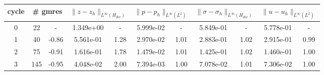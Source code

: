 \documentclass[10pt]{report}
\begin{document}
\begin{table}[H]
\begin{center}
\begin{tabular}{|c|c|c|c|c|c|c|c|c|c|c|} \hline
cycle & 
\multicolumn{2}{|c|}{\# gmres} & 
\multicolumn{2}{|c|}{$ \|z - z_h\|_{L^{\infty}(H_{div})} $} & 
\multicolumn{2}{|c|}{$ \|p - p_h\|_{L^{\infty}(L^2)} $} & 
\multicolumn{2}{|c|}{$ \|\sigma - \sigma_h\|_{L^{\infty}(H_{div})} $} & 
\multicolumn{2}{|c|}{$ \|u - u_h\|_{L^{\infty}(L^2)} $}\\ \hline
0 & 22 & - & 1.349e+00 & - & 5.999e-02 & - & 5.849e-01 & - & 5.778e-01 & -\\ \hline
1 & 40 & -0.86 & 5.561e-01 & 1.28 & 2.970e-02 & 1.01 & 2.883e-01 & 1.02 & 2.915e-01 & 0.99\\ \hline
2 & 75 & -0.91 & 1.616e-01 & 1.78 & 1.479e-02 & 1.01 & 1.425e-01 & 1.02 & 1.460e-01 & 1.00\\ \hline
3 & 145 & -0.95 & 4.048e-02 & 2.00 & 7.394e-03 & 1.00 & 7.078e-02 & 1.01 & 7.306e-02 & 1.00\\ \hline
\end{tabular}
\end{center}
\end{table}
\end{document}
